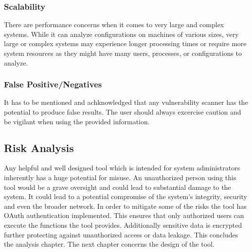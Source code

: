 \subsubsection{Scalability}

There are performance concerns when it comes to very large and complex systems. While it can analyze configurations on machines of various sizes, very large or complex systems may experience longer processing times or require more system resources as they might have many users, processes, or configurations to analyze.  

\subsubsection{False Positive/Negatives}

It has to be mentioned and achknowledged that any vulnerability scanner has the potential to produce false results. The user should always excercise caution and be vigilant when using the provided information.

\newpage

\subsection{Risk Analysis}

Any helpful and well designed tool which is intended for system administrators inherently has a huge potential for misuse. An unauthorized person using this tool would be a grave oversight and could lead to substantial damage to the system. It could lead to a potential compromise of the system's integrity, security and even the broader network. \newline\newline In order to mitigate some of the risks the tool has OAuth authentication implemented. This ensures that only authorized users can execute the functions the tool provides. Additionally sensitive data is encrypted further protecting against unauthorized access or data leakage. \newline\newline This concludes the analysis chapter. The next chapter concerns the design of the tool.













